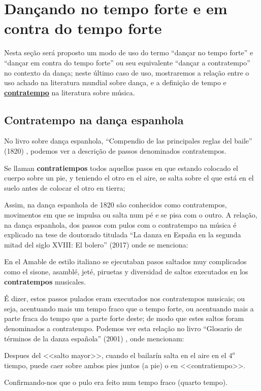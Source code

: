 \newpage
\section{Dançando no tempo forte e em contra do tempo forte}
\label{sec:dancandotempoforte}

Nesta seção será proposto um modo de uso do termo
``dançar no tempo forte'' e
``dançar em contra do tempo forte'' ou seu equivalente 
``dançar a contratempo'' no contexto da dança;
neste último caso de uso, mostraremos a relação entre o uso achado na literatura mundial sobre dança,
e a definição de tempo e \hyperref[sec:contratempo]{\textbf{contratempo}} na literatura sobre música.

\subsection{Contratempo na dança espanhola}
\label{subsec:contratempoespanha}
No livro sobre dança espanhola, ``Compendio de las principales reglas del baile'' (1820) \cite[pp. 131]{cairon1820compendio},
podemos ver a descrição de passos denominados contratempos.
\begin{citando}
Se llaman \textbf{contratiempos} todos aquellos pasos en que estando colocado el cuerpo sobre un pie,
y teniendo el otro en el aire,
se salta sobre el que está en el suelo antes de colocar el otro en tierra;
\end{citando}
Assim, na dança espanhola de 1820 são conhecidos como contratempos,
movimentos em que se impulsa ou salta num pé e se pisa com o outro. 
A relação, na dança espanhola,  dos passos com pulos
com o contratempo na música 
é explicado na tese de doutorado titulada 
``La danza en España en la segunda mitad del siglo XVIII: El bolero'' (2017)
\cite[pp. 160]{martin2017danza} onde se menciona:
\begin{citando}
En el Amable de estilo italiano se ejecutaban pasos saltados muy complicados como el sisone,
asamblé, jeté, piruetas y diversidad de saltos executados en los \textbf{contratempos} musicales.
\end{citando}
É dizer, estos passos pulados eram executados nos contratempos musicais;
ou seja, acentuando mais um tempo fraco que o tempo forte,
ou acentuando mais a parte fraca do tempo que a parte forte deste;
de modo que estes saltos foram denominados a contratempo.
Podemos ver esta relação no livro ``Glosario de términos de la danza española'' (2001)
\cite[pp. 109]{aubero2001glosario}, onde mencionam:
\begin{citando}
Despues del <<salto mayor>>, cuando el bailarín salta en el aire en el $4^o$ tiempo,
puede caer sobre ambos pies juntos (a pie) o en <<contratiempo>>.
\end{citando}
Confirmando-nos que o pulo era feito num tempo fraco (quarto tempo).



